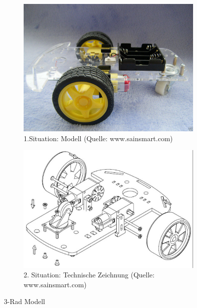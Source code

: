 \begin{figure} [hbp]
	\centering
	\begin{subfigure}[b]{0.4\textwidth}
		\includegraphics[width=\textwidth]{fig/3rad-1.jpg}
		\caption{1.Situation: Modell 
		(Quelle: www.sainsmart.com)}
	\end{subfigure}
	\hfill
	\begin{subfigure}[b]{0.36\textwidth}
		\includegraphics[width=\textwidth]{fig/3rad-3.JPG}
		\caption{2. Situation: Technische Zeichnung
		(Quelle: www.sainsmart.com)}
\end{subfigure}
	\caption{3-Rad Modell}\label{fig:animals}
\end{figure}

